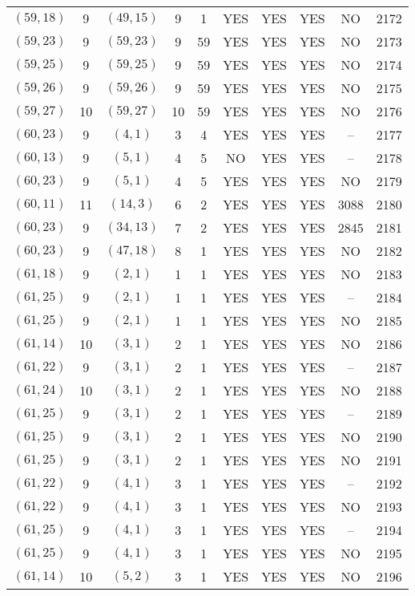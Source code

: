 \begin{longtable}{|c|c|c|c|c|c|c|c|c|c|}
$(59, 18)$ & 9 & $(49, 15)$ & 9 & 1 & YES & YES & YES & NO & 2172\\
$(59, 23)$ & 9 & $(59, 23)$ & 9 & 59 & YES & YES & YES & NO & 2173\\
$(59, 25)$ & 9 & $(59, 25)$ & 9 & 59 & YES & YES & YES & NO & 2174\\
$(59, 26)$ & 9 & $(59, 26)$ & 9 & 59 & YES & YES & YES & NO & 2175\\
$(59, 27)$ & 10 & $(59, 27)$ & 10 & 59 & YES & YES & YES & NO & 2176\\
$(60, 23)$ & 9 & $(4, 1)$ & 3 & 4 & YES & YES & YES & -- & 2177\\
$(60, 13)$ & 9 & $(5, 1)$ & 4 & 5 & NO & YES & YES & -- & 2178\\
$(60, 23)$ & 9 & $(5, 1)$ & 4 & 5 & YES & YES & YES & NO & 2179\\
$(60, 11)$ & 11 & $(14, 3)$ & 6 & 2 & YES & YES & YES & 3088 & 2180\\
$(60, 23)$ & 9 & $(34, 13)$ & 7 & 2 & YES & YES & YES & 2845 & 2181\\
$(60, 23)$ & 9 & $(47, 18)$ & 8 & 1 & YES & YES & YES & NO & 2182\\
$(61, 18)$ & 9 & $(2, 1)$ & 1 & 1 & YES & YES & YES & NO & 2183\\
$(61, 25)$ & 9 & $(2, 1)$ & 1 & 1 & YES & YES & YES & -- & 2184\\
$(61, 25)$ & 9 & $(2, 1)$ & 1 & 1 & YES & YES & YES & NO & 2185\\
$(61, 14)$ & 10 & $(3, 1)$ & 2 & 1 & YES & YES & YES & NO & 2186\\
$(61, 22)$ & 9 & $(3, 1)$ & 2 & 1 & YES & YES & YES & -- & 2187\\
$(61, 24)$ & 10 & $(3, 1)$ & 2 & 1 & YES & YES & YES & NO & 2188\\
$(61, 25)$ & 9 & $(3, 1)$ & 2 & 1 & YES & YES & YES & -- & 2189\\
$(61, 25)$ & 9 & $(3, 1)$ & 2 & 1 & YES & YES & YES & NO & 2190\\
$(61, 25)$ & 9 & $(3, 1)$ & 2 & 1 & YES & YES & YES & NO & 2191\\
$(61, 22)$ & 9 & $(4, 1)$ & 3 & 1 & YES & YES & YES & -- & 2192\\
$(61, 22)$ & 9 & $(4, 1)$ & 3 & 1 & YES & YES & YES & NO & 2193\\
$(61, 25)$ & 9 & $(4, 1)$ & 3 & 1 & YES & YES & YES & -- & 2194\\
$(61, 25)$ & 9 & $(4, 1)$ & 3 & 1 & YES & YES & YES & NO & 2195\\
$(61, 14)$ & 10 & $(5, 2)$ & 3 & 1 & YES & YES & YES & NO & 2196\\

\end{longtable}
